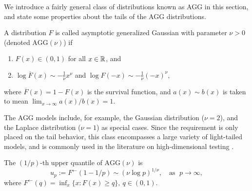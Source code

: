 
We introduce a fairly general class of distributions known as \ac{AGG} in this section, and state some properties about the tails of the AGG distributions.

\begin{definition} \label{def:AGG}
A distribution $F$ is called asymptotic generalized Gaussian with parameter $\nu>0$ (denoted $\text{AGG}(\nu)$) if
\begin{enumerate}
    \item $F(x)\in(0,1)$ for all $x\in\mathbb R$, and \smallskip
    \item $\log{\overline{F}(x)} \sim -\frac{1}{\nu}x^\nu$ and $\log{F(-x)} \sim -\frac{1}{\nu}(-x)^\nu,$ \label{eq:AGG}
\end{enumerate}
where $\overline{F}(x) = 1 - F(x)$ is the survival function, and $a(x)\sim b(x)$ is taken to mean $\lim_{x\to\infty} a(x)/b(x) = 1$.
\end{definition}

The AGG models include, for example, the Gaussian distribution ($\nu = 2$), and the Laplace distribution ($\nu = 1$) as special cases. 
Since the requirement is only placed on the tail behavior, this class encompasses a large variety of light-tailed models, and is commonly used in the literature on high-dimensional testing \citep{cai2007estimation, arias2017distribution}.



\begin{proposition} \label{prop:quantile}
The $(1/p)$-th upper quantile of $\text{AGG}(\nu)$ is
\begin{equation} \label{eq:AGG-quantiles}
    u_{p} := F^\leftarrow(1-1/p) \sim \left(\nu\log{p}\right)^{1/\nu},\quad \text{as }\;p\to\infty,
\end{equation}
where $F^\leftarrow(q) = \inf_x\{x:F(x)\ge q\},\ q\in (0,1)$.
\end{proposition}


